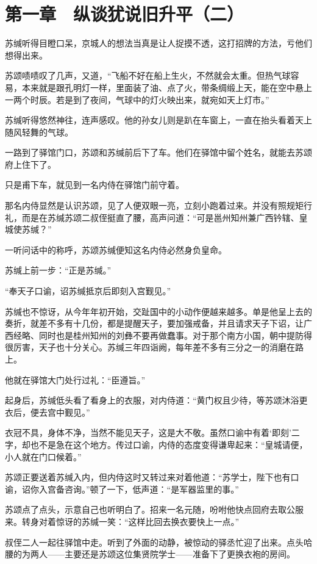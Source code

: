 \section{第一章　纵谈犹说旧升平（二）}

苏缄听得目瞪口呆，京城人的想法当真是让人捉摸不透，这打招牌的方法，亏他们想得出来。

苏颂啧啧叹了几声，又道，“飞船不好在船上生火，不然就会太重。但热气球容易，本来就是跟孔明灯一样，里面装了油、点了火，带条绸缎上天，能在空中悬上一两个时辰。若是到了夜间，气球中的灯火映出来，就宛如天上灯市。”

苏缄听得悠然神往，连声感叹。他的孙女儿则是趴在车窗上，一直在抬头看着天上随风轻舞的气球。

一路到了驿馆门口，苏颂和苏缄前后下了车。他们在驿馆中留个姓名，就能去苏颂府上住下了。

只是甫下车，就见到一名内侍在驿馆门前守着。

那名内侍显然是认识苏颂，见了人便双眼一亮，立刻小跑着过来。并没有照规矩行礼，而是在苏缄苏颂二叔侄挺直了腰，高声问道：“可是邕州知州兼广西钤辖、皇城使苏缄？”

一听问话中的称呼，苏颂苏缄便知这名内侍必然身负皇命。

苏缄上前一步：“正是苏缄。”

“奉天子口谕，诏苏缄抵京后即刻入宫觐见。”

苏缄也不惊讶，从今年年初开始，交趾国中的小动作便越来越多。单是他呈上去的奏折，就差不多有十几份，都是提醒天子，要加强戒备，并且请求天子下诏，让广西经略、同时也是桂州知州的刘彝不要再做蠢事。对于那个南方小国，朝中提防得很厉害，天子也十分关心。苏缄三年四诣阙，每年差不多有三分之一的消磨在路上。

他就在驿馆大门处行过礼：“臣遵旨。”

起身后，苏缄低头看了看身上的衣服，对内侍道：“黄门权且少待，等苏颂沐浴更衣后，便去宫中觐见。”

衣冠不具，身体不净，当然不能见天子，这是大不敬。虽然口谕中有着‘即刻’二字，却也不是急在这个地方。传过口谕，内侍的态度变得谦卑起来：“皇城请便，小人就在门口候着。”

苏颂正要送着苏缄入内，但内侍这时又转过来对着他道：“苏学士，陛下也有口谕，诏你入宫备咨询。”顿了一下，低声道：“是军器监里的事。”

苏颂点了点头，示意自己也听明白了。招来一名元随，吩咐他快点回府去取公服来。转身对着惊讶的苏缄一笑：“这样比回去换衣要快上一点。”

叔侄二人一起往驿馆中走。听到了外面的动静，被惊动的驿丞忙迎了出来。点头哈腰的为两人——主要还是苏颂这位集贤院学士——准备下了更换衣袍的房间。

